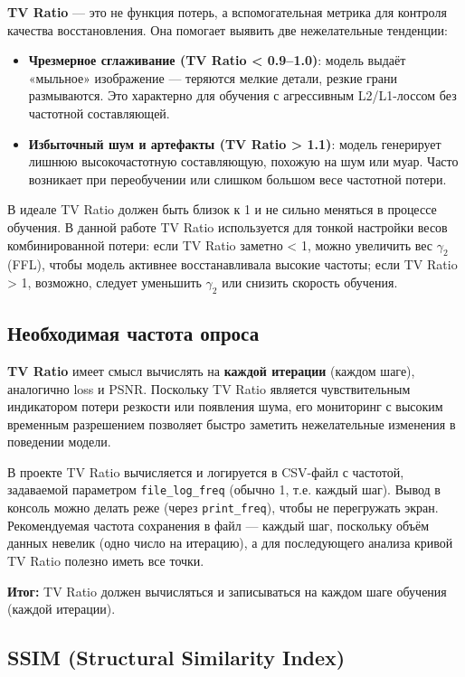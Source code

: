 \documentclass[12pt,a4paper]{article}
\begin{document}
\textbf{TV Ratio} — это не функция потерь, а вспомогательная метрика для контроля качества восстановления. Она помогает выявить две нежелательные тенденции:

\begin{itemize}
    \item \textbf{Чрезмерное сглаживание (TV Ratio < 0.9--1.0)}: модель выдаёт «мыльное» изображение — теряются мелкие детали, резкие грани размываются. Это характерно для обучения с агрессивным L2/L1-лоссом без частотной составляющей.
    \item \textbf{Избыточный шум и артефакты (TV Ratio > 1.1)}: модель генерирует лишнюю высокочастотную составляющую, похожую на шум или муар. Часто возникает при переобучении или слишком большом весе частотной потери.
\end{itemize}

В идеале TV Ratio должен быть близок к 1 и не сильно меняться в процессе обучения. В данной работе TV Ratio используется для тонкой настройки весов комбинированной потери: если TV Ratio заметно < 1, можно увеличить вес \(\gamma_2\) (FFL), чтобы модель активнее восстанавливала высокие частоты; если TV Ratio > 1, возможно, следует уменьшить \(\gamma_2\) или снизить скорость обучения.

\subsection{Необходимая частота опроса}

\textbf{TV Ratio} имеет смысл вычислять на \textbf{каждой итерации} (каждом шаге), аналогично loss и PSNR. Поскольку TV Ratio является чувствительным индикатором потери резкости или появления шума, его мониторинг с высоким временным разрешением позволяет быстро заметить нежелательные изменения в поведении модели.

В проекте TV Ratio вычисляется и логируется в CSV-файл с частотой, задаваемой параметром \texttt{file\_log\_freq} (обычно 1, т.е. каждый шаг). Вывод в консоль можно делать реже (через \texttt{print\_freq}), чтобы не перегружать экран. Рекомендуемая частота сохранения в файл — каждый шаг, поскольку объём данных невелик (одно число на итерацию), а для последующего анализа кривой TV Ratio полезно иметь все точки.

\textbf{Итог:} TV Ratio должен вычисляться и записываться на каждом шаге обучения (каждой итерации).

\subsection{SSIM (Structural Similarity Index)}
\end{document}
